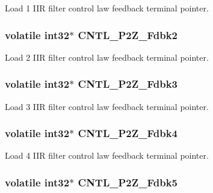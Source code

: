 Load 1 I\-I\-R filter control law feedback terminal pointer. \hypertarget{a00014_a6092ef1c1c54802bb5e11564f782390d}{
\subsubsection[{C\-N\-T\-L\-\_\-2\-P2\-Z\-\_\-\-Fdbk2}]{\setlength{\rightskip}{0pt plus 5cm}volatile int32$\ast$ C\-N\-T\-L\-\_\-P2\-Z\-\_\-\-Fdbk2}}\label{a00014_a6092ef1c1c54802bb5e11564f782390d}
Load 2 I\-I\-R filter control law feedback terminal pointer. \hypertarget{a00014_a939782d23ddbf7f45e5e393a65bafcff}{
\subsubsection[{C\-N\-T\-L\-\_\-2\-P2\-Z\-\_\-\-Fdbk3}]{\setlength{\rightskip}{0pt plus 5cm}volatile int32$\ast$ C\-N\-T\-L\-\_\-P2\-Z\-\_\-\-Fdbk3}}\label{a00014_a939782d23ddbf7f45e5e393a65bafcff}
Load 3 I\-I\-R filter control law feedback terminal pointer. \hypertarget{a00014_a6937e965f3ae840ea6ee43cce410680f}{
\subsubsection[{C\-N\-T\-L\-\_\-2\-P2\-Z\-\_\-\-Fdbk4}]{\setlength{\rightskip}{0pt plus 5cm}volatile int32$\ast$ C\-N\-T\-L\-\_\-P2\-Z\-\_\-\-Fdbk4}}\label{a00014_a6937e965f3ae840ea6ee43cce410680f}
Load 4 I\-I\-R filter control law feedback terminal pointer. \hypertarget{a00014_af5cbb635f31bbebd041e8543deb40dee}{
\subsubsection[{C\-N\-T\-L\-\_\-2\-P2\-Z\-\_\-\-Fdbk5}]{\setlength{\rightskip}{0pt plus 5cm}volatile int32$\ast$ C\-N\-T\-L\-\_\-P2\-Z\-\_\-\-Fdbk5}}\label{a00014_af5cbb635f31bbebd041e8543deb40dee}

